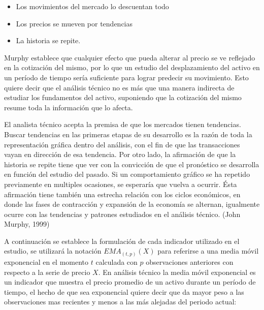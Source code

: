 \documentclass[a4paper,12pt]{Latex/Classes/PhDthesisPSnPDF}
\begin{document}
\begin{itemize}
\item Los movimientos del mercado lo descuentan  todo
\item Los precios se mueven por tendencias
\item La historia se repite.
\end{itemize}

Murphy establece que cualquier efecto que pueda alterar al precio se ve reflejado en la cotización del mismo, por lo que un estudio del desplazamiento del activo en un período de tiempo sería suficiente para lograr predecir su movimiento. Esto quiere decir que el análisis técnico no es más que una manera indirecta de estudiar los fundamentos del activo, suponiendo que la cotización del mismo resume toda la información que lo afecta. 

El analista técnico acepta la premisa de que los mercados tienen tendencias. Buscar tendencias en las primeras etapas de su desarrollo es la razón de toda la representación gráfica dentro del análisis, con el fin de que las transacciones vayan en dirección de esa tendencia. Por otro lado, la afirmación de que la historia se repite tiene que ver con la convicción de que el pronóstico se desarrolla en función del estudio del pasado. Si un comportamiento gráfico se ha repetido previamente en multiples ocasiones, se esperaría que vuelva a ocurrir. Ésta afirmación tiene también una estrecha relación con los ciclos económicos, en donde las fases de contracción y expansión de la economía se alternan, igualmente ocurre con las tendencias y patrones estudiados en el análisis técnico. (John Murphy, 1999) 

A continuación se establece la formulación de cada indicador utilizado en el estudio, se utilizará la notación $EMA_{(t, p)}(X)$ para referirse a una media móvil exponencial en el momento $t$ calculada con $p$ observaciones anteriores con respecto a la serie de precio $X$. En análisis técnico la media móvil exponencial es un indicador que muestra el precio promedio de un activo durante un período de tiempo, el hecho de que sea exponencial quiere decir que da mayor peso a las observaciones mas recientes y menos a las más alejadas del periodo actual:
\end{document}
